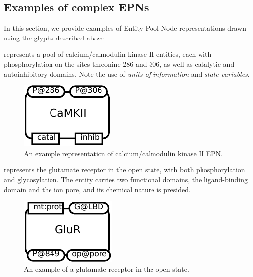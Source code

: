 \subsection{Examples of complex EPNs}
\label{sec:CplxEPNs}

In this section, we provide examples of Entity Pool Node representations drawn using the \SBGNPDLone glyphs described above. 

 represents a pool of calcium/calmodulin kinase II entities, each with phosphorylation on the sites threonine 286 and 306, as well as catalytic and autoinhibitory domains.  Note the use of \emph{units of information} and \emph{state variables}.

\begin{figure}[H]
  \centering
  \includegraphics[scale = 0.8]{images/build/macromolecule_camkii_example.pdf}
  \caption{An example representation of calcium/calmodulin kinase II EPN.}
  \label{fig:example-camkii}
\end{figure}

 represents the glutamate receptor in the open state, with both phosphorylation and glycosylation.  The entity carries two functional domains, the ligand-binding domain and the ion pore, and its chemical nature is presided.

\begin{figure}[H]
  \centering
  \includegraphics[scale = 0.8]{images/build/macromolecule_glu_r_example.pdf}
  \caption{An example of a glutamate receptor in the open state.}
  \label{fig:example-glur}
\end{figure}
